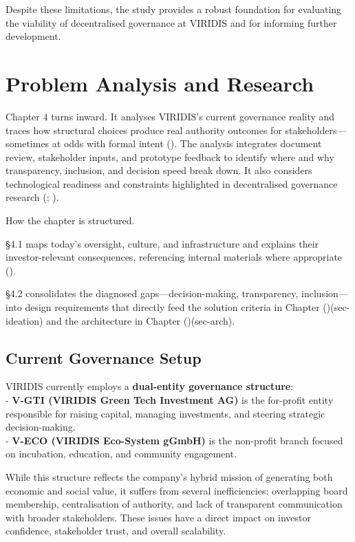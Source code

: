 \documentclass[
  english,
  12pt,
  oneside,
  open=any]{scrbook}
\begin{document}
Despite these limitations, the study provides a robust foundation for
evaluating the viability of decentralised governance at VIRIDIS and for
informing further development.

\chapter{Problem Analysis and Research}\label{sec-analysis}

Chapter 4 turns inward. It analyses VIRIDIS's current governance reality
and traces how structural choices produce real authority outcomes for
stakeholders---sometimes at odds with formal intent
().
The analysis integrates document review, stakeholder inputs, and
prototype feedback to identify where and why transparency, inclusion,
and decision speed break down. It also considers technological readiness
and constraints highlighted in decentralised governance research
(;
).

How the chapter is structured.

§4.1 maps today's oversight, culture, and infrastructure and explains
their investor-relevant consequences, referencing internal materials
where appropriate ().

§4.2 consolidates the diagnosed gaps---decision-making, transparency,
inclusion---into design requirements that directly feed the solution
criteria in Chapter ()(sec-ideation)
and the architecture in Chapter
()(sec-arch).

\section{Current Governance Setup}\label{sec-current-gov}

VIRIDIS currently employs a \textbf{dual-entity governance structure}:\\
- \textbf{V-GTI (VIRIDIS Green Tech Investment AG)} is the for-profit
entity responsible for raising capital, managing investments, and
steering strategic decision-making.\\
- \textbf{V-ECO (VIRIDIS Eco-System gGmbH)} is the non-profit branch
focused on incubation, education, and community engagement.

While this structure reflects the company's hybrid mission of generating
both economic and social value, it suffers from several inefficiencies:
overlapping board membership, centralisation of authority, and lack of
transparent communication with broader stakeholders. These issues have a
direct impact on investor confidence, stakeholder trust, and overall
scalability.
\end{document}
